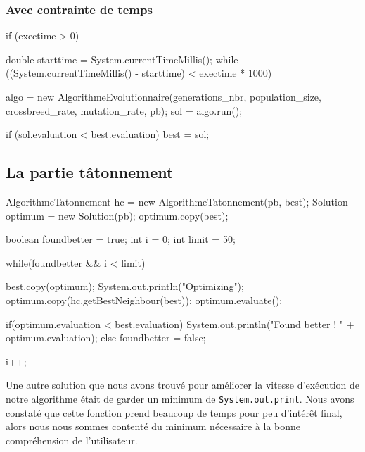 \vspace{1em}
\subsubsection{Avec contrainte de temps}
\begin{java}
if (exectime > 0) {
	double starttime = System.currentTimeMillis();
	while ((System.currentTimeMillis() - starttime) < exectime * 1000) {
		algo = new AlgorithmeEvolutionnaire(generations_nbr, population_size, crossbreed_rate, mutation_rate, pb);
		sol = algo.run();
		
		if (sol.evaluation < best.evaluation)
			best = sol;
	}
}
\end{java}

\vspace{1em}

\subsection{La partie tâtonnement}

\begin{java}
AlgorithmeTatonnement hc = new AlgorithmeTatonnement(pb, best);
Solution optimum = new Solution(pb);
optimum.copy(best);

boolean foundbetter = true;
int i = 0;
int limit = 50;

while(foundbetter && i < limit) {
	best.copy(optimum);
	System.out.println("Optimizing");
	optimum.copy(hc.getBestNeighbour(best));
	optimum.evaluate();
	
	if(optimum.evaluation < best.evaluation) {
		System.out.println("Found better ! " + optimum.evaluation);
	}
	else {
		foundbetter = false;
	}
	
	i++;
}
\end{java}

\vspace{1em}

Une autre solution que nous avons trouvé pour améliorer la vitesse  d'exécution de notre algorithme était de garder un minimum de \verb!System.out.print!. Nous avons constaté que cette fonction prend beaucoup de temps pour peu d'intérêt final, alors nous nous sommes contenté du minimum nécessaire à la bonne compréhension de l'utilisateur.
